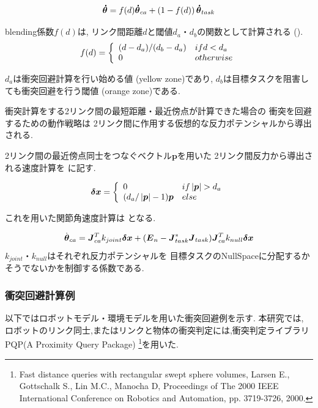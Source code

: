\begin{equation}
\labeq{collision-avoidance-all}
\bm{\dot{\theta}} = f(d)\bm{\dot{\theta}}_{ca}
+ \left(1-f(d)\right)\bm{\dot{\theta}}_{task}
\end{equation}

blending係数$f(d)$は,
リンク間距離$d$と閾値$d_a$・$d_b$の関数として計算される
().
\begin{eqnarray}
\labeq{collision-avoidance-blending-coefficient}
 f(d) =
  \left\{
   \begin{array}{l l}
     (d-d_a)/(d_b-d_a) & if d<d_a\\
     0 & otherwise
    \end{array}
  \right.
\end{eqnarray}

$d_a$は衝突回避計算を行い始める値
(yellow zone)であり,
$d_b$は目標タスクを阻害しても衝突回避を行う閾値
(orange zone)である.


衝突計算をする2リンク間の最短距離・最近傍点が計算できた場合の
衝突を回避するための動作戦略は
2リンク間に作用する仮想的な反力ポテンシャルから導出される.

2リンク間の最近傍点同士をつなぐベクトル$\bm{p}$を用いた
2リンク間反力から導出される速度計算を
に記す.

\begin{eqnarray}
  \labeq{collision-avoidance-distance-force}
  \bm{\delta x} =
  \left\{
   \begin{array}{l l}
     0 & if \left|\bm{p}\right|>d_{a}\\
     (d_{a}/\left|\bm{p}\right|-1)\bm{p} & else
    \end{array}
  \right.
\end{eqnarray}

これを用いた関節角速度計算は
となる.

\begin{equation}
\labeq{collision-avoidance-joint-speed}
\dot{\bm{\theta}}_{ca} = \bm{J}_{ca}^{T} k_{joint} \bm{\delta x}
+ (\bm{E}_n - \bm{J}_{task}^{*}\bm{J}_{task}) \bm{J}_{ca}^{T} k_{null} \bm{\delta x}
\end{equation}
$k_{joint}$・$k_{null}$はそれぞれ反力ポテンシャルを
目標タスクのNullSpaceに分配するかそうでないかを制御する係数である.


\subsubsection{衝突回避計算例}
以下ではロボットモデル・環境モデルを用いた衝突回避例を示す.
本研究では,
ロボットのリンク同士,またはリンクと物体の衝突判定には,衝突判定ライブラリ
PQP(A Proximity Query Package)
\footnote{
Fast distance queries with rectangular swept sphere volumes,
Larsen E., Gottschalk S., Lin M.C., Manocha D, 
Proceedings of The 2000 IEEE International Conference on Robotics and Automation, pp. 3719-3726, 2000.
}を用いた.

